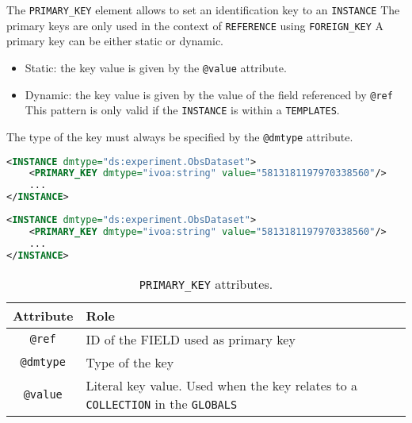 The \texttt{PRIMARY\_KEY} element allows to set an identification key to an \texttt{INSTANCE}  The primary keys are only used in the context of \texttt{REFERENCE}  using \texttt{FOREIGN\_KEY} 
A primary key can be either static or dynamic.

\begin{itemize}
    \item Static: the key value is given by the \texttt{@value} attribute.
    \item Dynamic: the key value is given by the value of the field referenced by \texttt{@ref}  
    This pattern is only valid if the \texttt{INSTANCE} is within a \texttt{TEMPLATES}. 
\end{itemize}

The type of the key must always be specified by the \texttt{@dmtype} attribute. 

\begin{lstlisting}[caption={The \texttt{INSTANCE} is identified within a \texttt{COLLECTION} by the \texttt{PRIMARY\_KEY} value (see line~\ref{PRIMARY_KEY_snippet} in Appendix A).},language=XML]
<INSTANCE dmtype="ds:experiment.ObsDataset">
    <PRIMARY_KEY dmtype="ivoa:string" value="5813181197970338560"/>
    ...
</INSTANCE>
\end{lstlisting}

\begin{lstlisting}[caption={The \texttt{INSTANCE} is identified within a \texttt{COLLECTION} by the \texttt{PRIMARY\_KEY} value (see line~\ref{PRIMARY_KEY_snippet} in Appendix A).},language=XML]
<INSTANCE dmtype="ds:experiment.ObsDataset">
    <PRIMARY_KEY dmtype="ivoa:string" value="5813181197970338560"/>
    ...
</INSTANCE>
\end{lstlisting}

\begin{table}[!htbp]
\small
\centering
\begin{tabulary}{\linewidth}{|c|J|}       
       \hline 
            \textbf{Attribute} & 
            \textbf {Role}\\
       \hline         \hline  
            \texttt{@ref} &
            ID of the FIELD used as primary key \\
        \hline 
            \texttt{@dmtype} & 
            Type of the key \\
        \hline 
            \texttt{@value} & 
            Literal key value. Used when the key relates to a \texttt{COLLECTION} in the \texttt{GLOBALS} \\
        \hline 
     \end{tabulary}
     \caption{\texttt{PRIMARY\_KEY} attributes.} 
     \label{tbl:primarykey-att}
 \end{table}

